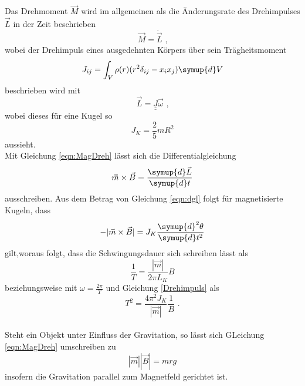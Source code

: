 \noindent Das Drehmoment $\vec{M}$ wird im allgemeinen als die Änderungsrate des Drehimpulses $\vec{L}$ in der Zeit beschrieben
\begin{equation}
    \vec{M}=\dot{\vec{L}}\text{ ,}
\end{equation}
wobei der Drehimpuls eines ausgedehnten Körpers über sein Trägheitsmoment 
\begin{equation}
    J_{ij}=\int_V\rho(r)(r^2\delta_{ij}-x_ix_j)\symup{d}V
\end{equation}
beschrieben wird mit 
\begin{equation}
    \vec{L}=\underline{\underline{J}}\vec{\omega} \text{ ,}
    \label{eqn:Drehimpuls}
\end{equation}
wobei dieses für eine Kugel so
\begin{equation}
    J_K=\frac{2}{5}mR^2
    \label{eqn:trägheit_kugel}
\end{equation}
aussieht. \\

\noindent Mit Gleichung \ref{eqn:MagDreh} lässt sich die Differentialgleichung
\begin{equation}
    \vec{m}\times\vec{B}=\frac{\symup{d}\vec{L}}{\symup{d}t}
    \label{eqn:dgl}
\end{equation}
ausschreiben.
Aus dem Betrag von Gleichung \ref{eqn:dgl} folgt für magnetisierte Kugeln, dass
\begin{equation}
    -|\vec{m}\times\vec{B}|=J_K\frac{\symup{d}^2\theta}{\symup{d}t^2}
    \label{eqn:dglmagmom}
\end{equation}
gilt,woraus folgt, dass die Schwingungsdauer sich schreiben lässt als
\begin{equation}
    \frac{1}{T}=\frac{|\vec{m}|}{2\pi L_K}B
    \label{eqn:schwingdauer1}
\end{equation}
beziehungsweise mit $\omega=\frac{2\pi}{T}$ und Gleichung \ref{Drehimpuls} als
\begin{equation}
    T^2=\frac{4\pi^2J_K}{|\vec{m}|}\frac{1}{B} \text{ .}
    \label{eqn:schwingdauer2}
\end{equation}\\

\noindent Steht ein Objekt unter Einfluss der Gravitation, so lässt sich GLeichung \ref{eqn:MagDreh} umschreiben zu
\begin{equation}
    |\vec{m}||\vec{B}|=mrg
    \label{eqn:dreh_grav}
\end{equation}
insofern die Gravitation parallel zum Magnetfeld gerichtet ist.

